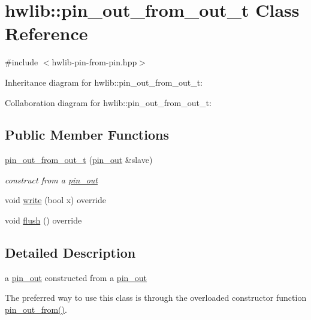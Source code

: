 \hypertarget{classhwlib_1_1pin__out__from__out__t}{}\section{hwlib\+:\+:pin\+\_\+out\+\_\+from\+\_\+out\+\_\+t Class Reference}
\label{classhwlib_1_1pin__out__from__out__t}


{\ttfamily \#include $<$hwlib-\/pin-\/from-\/pin.\+hpp$>$}



Inheritance diagram for hwlib\+:\+:pin\+\_\+out\+\_\+from\+\_\+out\+\_\+t\+:


Collaboration diagram for hwlib\+:\+:pin\+\_\+out\+\_\+from\+\_\+out\+\_\+t\+:
\subsection*{Public Member Functions}
\begin{DoxyCompactItemize}
\item 
\mbox{\label{classhwlib_1_1pin__out__from__out__t_ab6fa04ff53051f0ecfab8d352039667b}} 
\hyperlink{classhwlib_1_1pin__out__from__out__t_ab6fa04ff53051f0ecfab8d352039667b}{pin\+\_\+out\+\_\+from\+\_\+out\+\_\+t} (\hyperlink{classhwlib_1_1pin__out}{pin\+\_\+out} \&slave)
\begin{DoxyCompactList}\small\item\em construct from a \hyperlink{classhwlib_1_1pin__out}{pin\+\_\+out} \end{DoxyCompactList}\item 
void \hyperlink{classhwlib_1_1pin__out__from__out__t_acda4bf8988bab6746d7bb9d520c303ce}{write} (bool x) override
\item 
void \hyperlink{classhwlib_1_1pin__out__from__out__t_ac3a382842264da94644aeb2d8981ffd4}{flush} () override
\end{DoxyCompactItemize}


\subsection{Detailed Description}
a \hyperlink{classhwlib_1_1pin__out}{pin\+\_\+out} constructed from a \hyperlink{classhwlib_1_1pin__out}{pin\+\_\+out}

The preferred way to use this class is through the overloaded constructor function \hyperlink{namespacehwlib_aa1e6aac16c5ac14715e165b463ec6a46}{pin\+\_\+out\+\_\+from()}. 

